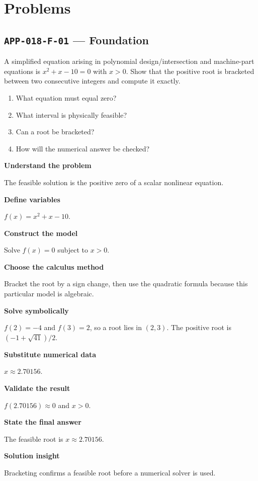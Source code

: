 \documentclass[11pt]{book}
\newcommand{\pid}[1]{\texttt{#1}}
\begin{document}
\section*{Problems}
\subsection*{\pid{APP-018-F-01} — Foundation}
\begin{problembox}
A simplified equation arising in polynomial design/intersection and machine-part equations is $x^2+x-10=0$ with $x>0$. Show that the positive root is bracketed between two consecutive integers and compute it exactly.
\end{problembox}
\begin{promptbox}\begin{enumerate}
\item What equation must equal zero?
\item What interval is physically feasible?
\item Can a root be bracketed?
\item How will the numerical answer be checked?
\end{enumerate}\end{promptbox}
\begin{solutionbox}
\textbf{Understand the problem}\par The feasible solution is the positive zero of a scalar nonlinear equation.\par\medskip
\textbf{Define variables}\par $f(x)=x^2+x-10$.\par\medskip
\textbf{Construct the model}\par Solve $f(x)=0$ subject to $x>0$.\par\medskip
\textbf{Choose the calculus method}\par Bracket the root by a sign change, then use the quadratic formula because this particular model is algebraic.\par\medskip
\textbf{Solve symbolically}\par $f(2)=-4$ and $f(3)=2$, so a root lies in $(2,3)$. The positive root is $(-1+\sqrt{41})/2$.\par\medskip
\textbf{Substitute numerical data}\par $x\approx 2.70156$.\par\medskip
\textbf{Validate the result}\par $f(2.70156)\approx 0$ and $x>0$.\par\medskip
\textbf{State the final answer}\par The feasible root is $x\approx 2.70156$.\par\medskip
\textbf{Solution insight}\par Bracketing confirms a feasible root before a numerical solver is used.\par\medskip
\end{solutionbox}
\end{document}
